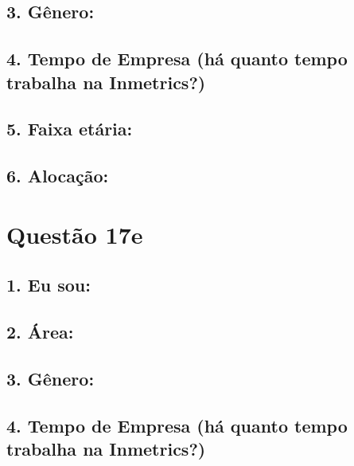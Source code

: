 \documentclass[]{book}
\begin{document}
\hypertarget{genero-38}{%
\subsection{3. Gênero:}\label{genero-38}}

\hypertarget{tempo-de-empresa-ha-quanto-tempo-trabalha-na-inmetrics-38}{%
\subsection{4. Tempo de Empresa (há quanto tempo trabalha na Inmetrics?)}\label{tempo-de-empresa-ha-quanto-tempo-trabalha-na-inmetrics-38}}

\hypertarget{faixa-etaria-38}{%
\subsection{5. Faixa etária:}\label{faixa-etaria-38}}

\hypertarget{alocacao-38}{%
\subsection{6. Alocação:}\label{alocacao-38}}

\hypertarget{questao-17e}{%
\section{Questão 17e}\label{questao-17e}}

\hypertarget{eu-sou-39}{%
\subsection{1. Eu sou:}\label{eu-sou-39}}

\hypertarget{area-39}{%
\subsection{2. Área:}\label{area-39}}

\hypertarget{genero-39}{%
\subsection{3. Gênero:}\label{genero-39}}

\hypertarget{tempo-de-empresa-ha-quanto-tempo-trabalha-na-inmetrics-39}{%
\subsection{4. Tempo de Empresa (há quanto tempo trabalha na Inmetrics?)}\label{tempo-de-empresa-ha-quanto-tempo-trabalha-na-inmetrics-39}}
\end{document}
